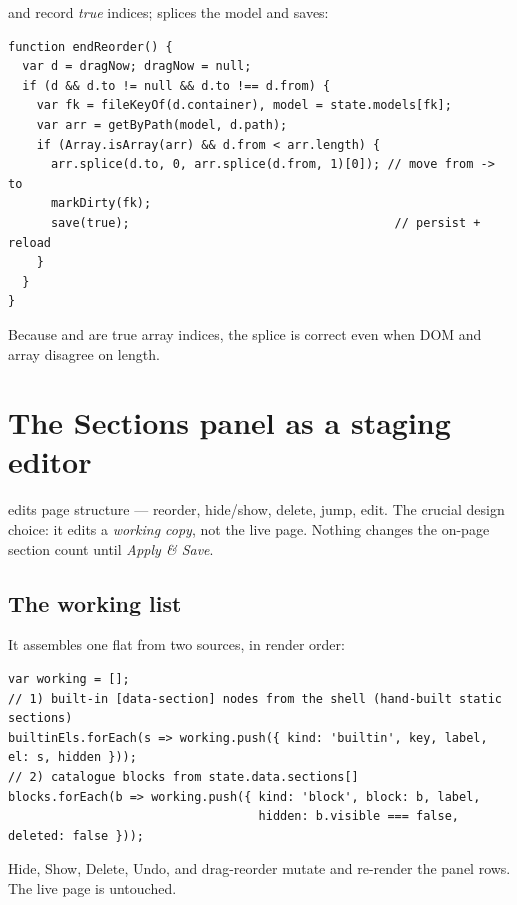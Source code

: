 \documentclass[11pt]{article}
\begin{document}
 and  record \emph{true} indices; 
splices the model and saves:

\begin{lstlisting}
function endReorder() {
  var d = dragNow; dragNow = null;
  if (d && d.to != null && d.to !== d.from) {
    var fk = fileKeyOf(d.container), model = state.models[fk];
    var arr = getByPath(model, d.path);
    if (Array.isArray(arr) && d.from < arr.length) {
      arr.splice(d.to, 0, arr.splice(d.from, 1)[0]); // move from -> to
      markDirty(fk);
      save(true);                                     // persist + reload
    }
  }
}
\end{lstlisting}

Because  and  are true array indices, the splice is correct
even when DOM and array disagree on length.

\section{The Sections panel as a staging editor}\label{sec:sections}

 edits page structure --- reorder, hide/show, delete, jump,
edit. The crucial design choice: it edits a \emph{working copy}, not the live page.
Nothing changes the on-page section count until \emph{Apply \& Save}.

\subsection{The working list}

It assembles one flat  from two sources, in render order:

\begin{lstlisting}
var working = [];
// 1) built-in [data-section] nodes from the shell (hand-built static sections)
builtinEls.forEach(s => working.push({ kind: 'builtin', key, label, el: s, hidden }));
// 2) catalogue blocks from state.data.sections[]
blocks.forEach(b => working.push({ kind: 'block', block: b, label,
                                   hidden: b.visible === false, deleted: false }));
\end{lstlisting}

Hide, Show, Delete, Undo, and drag-reorder mutate  and re-render
the panel rows. The live page is untouched.
\end{document}
